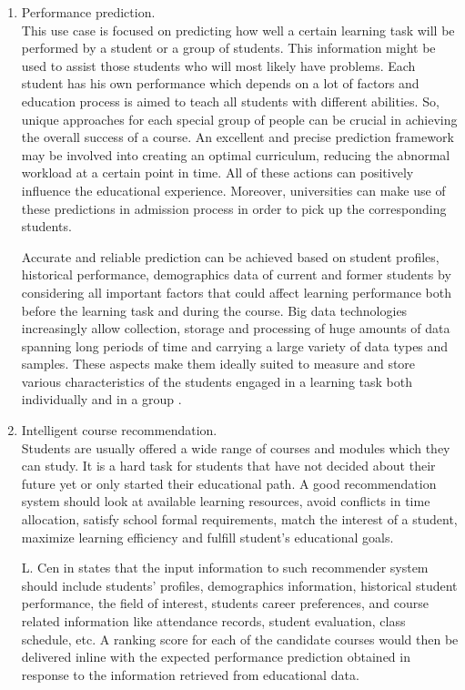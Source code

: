 \documentclass[runningheads]{llncs}
\begin{document}
\begin{enumerate}
\item Performance prediction.\\

This use case is focused on predicting how well a certain learning task will be performed by a student or a group of students. This information might be used to assist those students who will most likely have problems. Each student has his own performance which depends on a lot of factors and education process is aimed to teach all students with different abilities. So, unique approaches for each special group of people can be crucial in achieving the overall success of a course. An excellent and precise prediction framework may be involved into creating an optimal curriculum, reducing the abnormal workload at a certain point in time. All of these actions can positively influence the educational experience. Moreover, universities can make use of these predictions in admission process in order to pick up the corresponding students.

Accurate and reliable prediction can be achieved based on student profiles, historical performance, demographics data of current and former students by considering all important factors that could affect learning performance both before the learning task and during the course. Big data technologies increasingly allow collection, storage and processing of huge amounts of data spanning long periods of time and carrying a large variety of data types and samples. These aspects make them ideally suited to measure and store various characteristics of the students engaged in a learning task both individually and in a group \cite{EDUCATIONOPPORTUNITIES}.\\

\item Intelligent course recommendation.\\

Students are usually offered a wide range of courses and modules which they can study. It is a hard task for students that have not decided about their future yet or only started their educational path. A good recommendation system should look at available learning resources, avoid conflicts in time allocation, satisfy school formal requirements, match the interest of a student, maximize learning efficiency and fulfill student's educational goals.

L. Cen in \cite{EDUCATIONOPPORTUNITIES} states that the input information to such recommender system should include students' profiles, demographics information, historical student performance, the field of interest, students career preferences, and course related information like attendance records, student evaluation,
class schedule, etc. A ranking score for each of the candidate courses would then be delivered inline with the expected performance prediction obtained in response to the information retrieved from educational data.\\


\end{enumerate}
\end{document}
